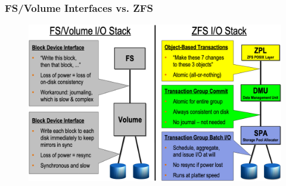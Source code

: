% 
% 
% 
% 
\begin{frame}[fragile]
    \frametitle{FS/Volume Interfaces vs. ZFS}
    \begin{figure}
    \includegraphics[width=0.7\linewidth]{figs/ZFS-io-stack.png}
    \end{figure}
\end{frame}
% 
% 
% 

